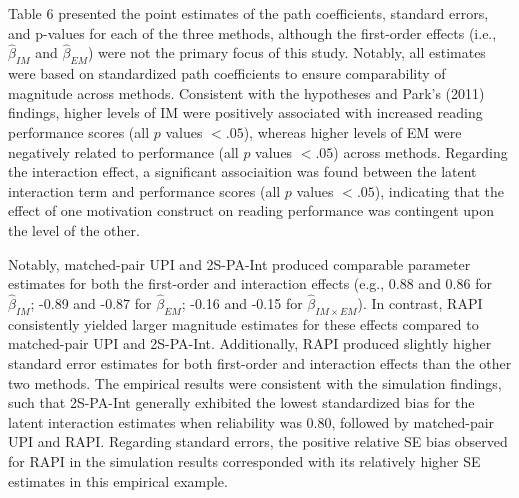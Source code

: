 \documentclass[
  man]{apa6}
\begin{document}
Table 6 presented the point estimates of the path coefficients, standard errors, and p-values for each of the three methods, although the first-order effects (i.e., \(\hat{\beta}_{IM}\) and \(\hat{\beta}_{EM}\)) were not the primary focus of this study. Notably, all estimates were based on standardized path coefficients to ensure comparability of magnitude across methods. Consistent with the hypotheses and Park's (2011) findings, higher levels of IM were positively associated with increased reading performance scores (all \(\textit{p}\) values \(< .05\)), whereas higher levels of EM were negatively related to performance (all \(\textit{p}\) values \(< .05\)) across methods. Regarding the interaction effect, a significant associaition was found between the latent interaction term and performance scores (all \(\textit{p}\) values \(< .05\)), indicating that the effect of one motivation construct on reading performance was contingent upon the level of the other.

Notably, matched-pair UPI and 2S-PA-Int produced comparable parameter estimates for both the first-order and interaction effects (e.g., 0.88 and 0.86 for \(\hat{\beta}_{IM}\); -0.89 and -0.87 for \(\hat{\beta}_{EM}\); -0.16 and -0.15 for \(\hat{\beta}_{IM \times EM}\)). In contrast, RAPI consistently yielded larger magnitude estimates for these effects compared to matched-pair UPI and 2S-PA-Int. Additionally, RAPI produced slightly higher standard error estimates for both first-order and interaction effects than the other two methods. The empirical results were consistent with the simulation findings, such that 2S-PA-Int generally exhibited the lowest standardized bias for the latent interaction estimates when reliability was 0.80, followed by matched-pair UPI and RAPI. Regarding standard errors, the positive relative SE bias observed for RAPI in the simulation results corresponded with its relatively higher SE estimates in this empirical example.
\end{document}
